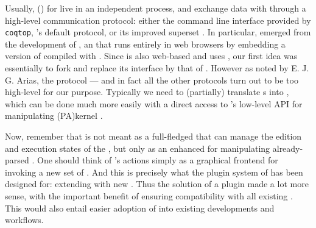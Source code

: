 \AP
Usually,  () for
 live in an independent process, and exchange data with  through
a high-level communication protocol: either the command line interface provided
by \texttt{coqtop}, 's default  protocol, or its improved
superset  . In particular,
 emerged from the development of 
, an  that runs entirely in web browsers by
embedding a version of  compiled with . Since
 is also web-based and uses , our first idea was
essentially to fork  and replace its interface by that of .
However as noted by E. J. G. Arias, the  protocol --- and in fact all
the other protocols turn out to be too high-level for our purpose. Typically we
need to (partially) translate  s into  ,
which can be done much more easily with a direct access to 's low-level
API for manipulating \kl(PA){kernel} .

Now, remember that  is not meant as a full-fledged  that can
manage the edition and execution states of the , but only as an
enhanced  for manipulating already-parsed . One should
think of 's actions simply as a graphical frontend for invoking a new
set of . And this is precisely what the plugin system of 
has been designed for: extending  with new . Thus the
solution of a  plugin made a lot more sense, with the important benefit
of ensuring compatibility with all existing . This would also entail
easier adoption of  into existing  developments and
workflows.

